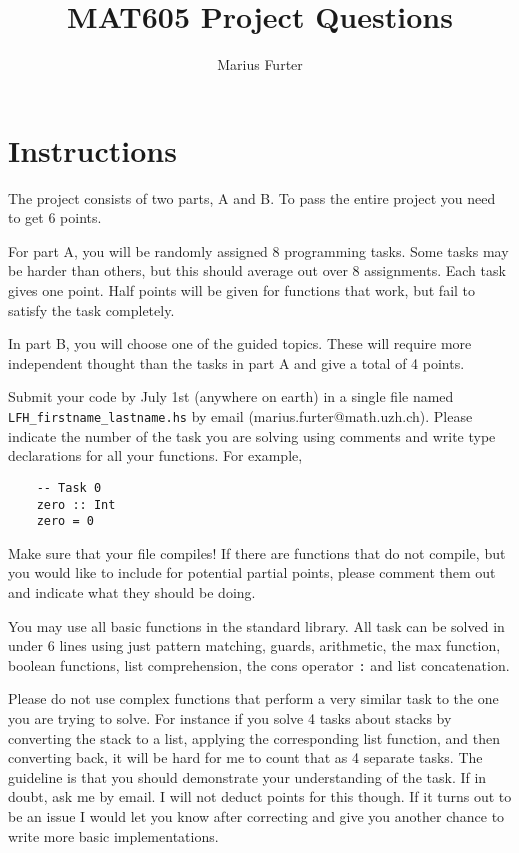 \documentclass{article}[12pt]
\title{MAT605 Project Questions}
\author{Marius Furter}
\theoremstyle{definition}
\begin{document}
\maketitle

\section{Instructions}
The project consists of two parts, A and B. To pass the entire project you need to get 6 points.

For part A, you will be randomly assigned 8 programming tasks. Some tasks may be harder than others, but this should average out over 8 assignments. Each task gives one point. Half points will be given for functions that work, but fail to satisfy the task completely.

In part B, you will choose one of the guided topics. These will require more independent thought than the tasks in part A and give a total of 4 points. 

Submit your code by July 1st (anywhere on earth) in a single file named \verb|LFH_firstname_lastname.hs| by email (marius.furter@math.uzh.ch). Please indicate the number of the task you are solving using comments and write type declarations for all your functions. For example,
\begin{verbatim}
    -- Task 0
    zero :: Int
    zero = 0
\end{verbatim}
Make sure that your file compiles! If there are functions that do not compile, but you would like to include for potential partial points, please comment them out and indicate what they should be doing.

You may use all basic functions in the standard library. All task can be solved in under 6 lines using just pattern matching, guards, arithmetic, the max function, boolean functions, list comprehension, the cons operator \verb|:| and list concatenation. 

Please do not use complex functions that perform a very similar task to the one you are trying to solve. For instance if you solve 4 tasks about stacks by converting the stack to a list, applying the corresponding list function, and then converting back, it will be hard for me to count that as 4 separate tasks. The guideline is that you should demonstrate your understanding of the task. If in doubt, ask me by email. I will not deduct points for this though. If it turns out to be an issue I would let you know after correcting and give you another chance to write more basic implementations.
\end{document}
